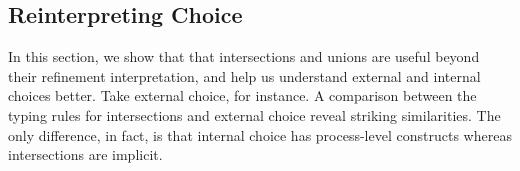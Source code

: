 \documentclass[submission,copyright,creativecommons]{eptcs}
\newcommand\indexVar{k}
\renewcommand{\intersect}{\mathrel{\sqcap}}
\renewcommand{\union}{\mathrel{\sqcup}}
\newcommand{\m}[1]{\mathsf{#1}}
\begin{document}


\subsection{Reinterpreting Choice}
\label{reinterpreting-choice}

In this section, we show that that intersections and unions are useful beyond their refinement interpretation, and help us understand external and internal choices better. Take external choice, for instance. A comparison between the typing rules for intersections and external choice reveal striking similarities. The only difference, in fact, is that internal choice has process-level constructs whereas intersections are implicit.
\end{document}
